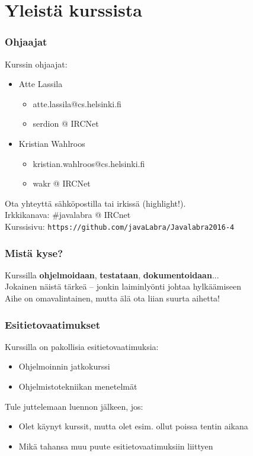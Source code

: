 \documentclass[finnish]{beamer}
\institute{Helsingin Yliopisto, TKTL}
\author{Atte Lassila, Kristian Wahlroos}
\date{14. maaliskuuta - 06. toukokuuta}
\begin{document}
	\frame{\titlepage}
	
	\section{Yleistä kurssista}
	
	\begin{frame}
		\frametitle{Ohjaajat}
		
		Kurssin ohjaajat:
		\begin{itemize}
			\item Atte Lassila
			\begin{itemize}
				\item atte.lassila@cs.helsinki.fi
				\item serdion @ IRCNet
			\end{itemize}
			\item Kristian Wahlroos
			\begin{itemize}
				\item kristian.wahlroos@cs.helsinki.fi
				\item wakr @ IRCNet
			\end{itemize}
		\end{itemize}
		
		Ota yhteyttä sähköpostilla tai irkissä (highlight!). \\
		Irkkikanava: \#javalabra @ IRCnet \\
		Kurssisivu: \texttt{https://github.com/javaLabra/Javalabra2016-4}
	\end{frame}
	
	\begin{frame}
		\frametitle{Mistä kyse?}

		Kurssilla \textbf{ohjelmoidaan}, \textbf{testataan}, \textbf{dokumentoidaan}... \\
		Jokainen näistä tärkeä -- jonkin laiminlyönti johtaa hylkäämiseen \\
		Aihe on omavalintainen, mutta älä ota liian suurta aihetta!
	\end{frame}
	
	\begin{frame}
		\frametitle{Esitietovaatimukset}
		
		Kurssilla on pakollisia esitietovaatimuksia:
		\begin{itemize}
			\item Ohjelmoinnin jatkokurssi
			\item Ohjelmistotekniikan menetelmät
		\end{itemize}
		
		Tule juttelemaan luennon jälkeen, jos: 
		\begin{itemize}
			\item Olet käynyt kurssit, mutta olet esim. ollut poissa tentin aikana
			\item Mikä tahansa muu puute esitietovaatimuksiin liittyen
		\end{itemize}
	\end{frame}
	
\end{document}
